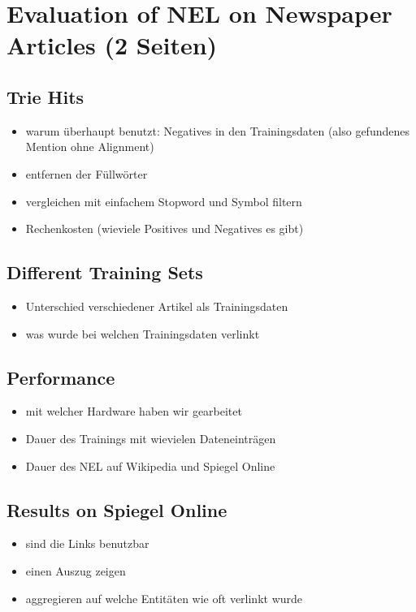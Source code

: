 \section{Evaluation of NEL on Newspaper Articles (2 Seiten)}
	\subsection{Trie Hits}
	\begin{itemize}
		\item warum überhaupt benutzt: Negatives in den Trainingsdaten (also gefundenes Mention ohne Alignment)
		\item entfernen der Füllwörter
		\item vergleichen mit einfachem Stopword und Symbol filtern
		\item Rechenkosten (wieviele Positives und Negatives es gibt)
	\end{itemize}
	\subsection{Different Training Sets}
	\begin{itemize}
		\item Unterschied verschiedener Artikel als Trainingsdaten
		\item was wurde bei welchen Trainingsdaten verlinkt
	\end{itemize}
	\subsection{Performance}
	\begin{itemize}
		\item mit welcher Hardware haben wir gearbeitet
		\item Dauer des Trainings mit wievielen Dateneinträgen
		\item Dauer des NEL auf Wikipedia und Spiegel Online
	\end{itemize}
	\subsection{Results on Spiegel Online}
	\begin{itemize}
		\item sind die Links benutzbar
		\item einen Auszug zeigen
		\item aggregieren auf welche Entitäten wie oft verlinkt wurde
	\end{itemize}
	